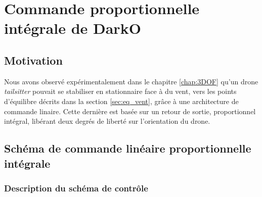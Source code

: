 \chapter{Commande proportionnelle intégrale de DarkO}
\minitoc
\label{chap:6DOF}

\section{Motivation}
\label{sec:motivation6DOF}
Nous avons observé expérimentalement dans le chapitre \ref{chap:3DOF} qu'un drone \textit{tailsitter} pouvait se stabiliser en stationnaire face à du vent, vers les points d'équilibre décrits dans la section \ref{sec:eq_vent}, grâce à une architecture de commande linaire. Cette dernière est basée sur un retour de sortie, proportionnel intégral, libérant deux degrés de liberté sur l'orientation du drone.


\section{Schéma de commande linéaire proportionnelle intégrale}
\label{sec:6dofcmd}
\subsection{Description du schéma de contrôle}
\label{sec:ctl_sche}

